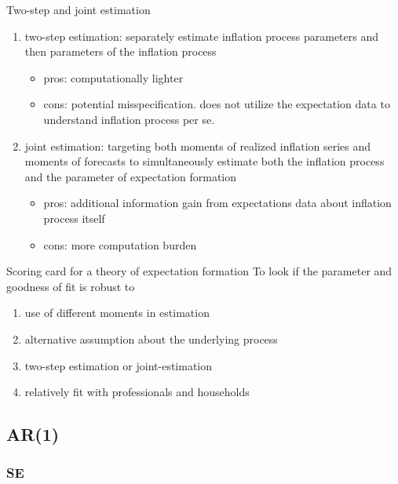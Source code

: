 \documentclass{beamer}
\begin{document}
\begin{frame}{Two-step and joint estimation}
	\begin{enumerate}
		\item two-step estimation:  separately estimate inflation process parameters and then parameters of the inflation process
		\begin{itemize}
			\item pros: computationally lighter 
			\item cons: potential misspecification. does not utilize the expectation data to understand inflation process per se.  
		\end{itemize}
		\item joint estimation: targeting both moments of realized inflation series and moments of forecasts to simultaneously estimate both the inflation process and the parameter of expectation formation
		\begin{itemize}
			\item pros: additional information gain from expectations data about inflation process itself
			\item cons: more computation burden  
		\end{itemize}
	\end{enumerate}
\end{frame}


\begin{frame}{Scoring card for a theory of expectation formation}
	To look if the parameter and goodness of fit is robust to 
	\begin{enumerate}
		\item use of different moments in estimation
		\item alternative assumption about the underlying process 
		\item two-step estimation or joint-estimation 
		\item relatively fit with professionals and households  
	\end{enumerate}
\end{frame}

\subsection{AR(1)}

\subsubsection{SE}
\end{document}
